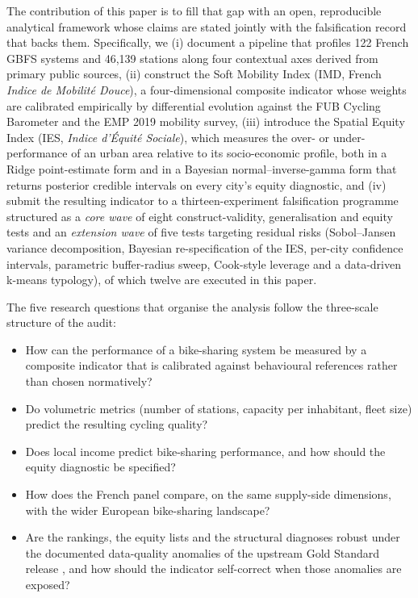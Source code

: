 \documentclass[11pt,a4paper]{article}
\begin{document}
The contribution of this paper is to fill that gap with an open,
reproducible analytical framework whose claims are stated jointly
with the falsification record that backs them. Specifically, we
(i) document a pipeline that profiles 122 French GBFS systems and
46{,}139 stations along four contextual axes derived from primary
public sources, (ii) construct the Soft Mobility Index (IMD,
French \emph{Indice de Mobilit\'e Douce}), a four-dimensional
composite indicator whose weights are calibrated empirically by
differential evolution against the FUB Cycling Barometer and the
EMP 2019 mobility survey, (iii) introduce the Spatial Equity Index
(IES, \emph{Indice d'\'Equit\'e Sociale}), which measures the
over- or under-performance of an urban area relative to its
socio-economic profile, both in a Ridge point-estimate form and in
a Bayesian normal--inverse-gamma form that returns posterior
credible intervals on every city's equity diagnostic, and (iv)
submit the resulting indicator to a thirteen-experiment
falsification programme structured as a \emph{core wave} of eight
construct-validity, generalisation and equity tests and an
\emph{extension wave} of five tests targeting residual risks
(Sobol--Jansen variance decomposition, Bayesian re-specification
of the IES, per-city confidence intervals, parametric
buffer-radius sweep, Cook-style leverage and a data-driven
k-means typology), of which twelve are executed in this paper.

The five research questions that organise the analysis follow
the three-scale structure of the audit:
\begin{itemize}
    \item[Q1.] How can the performance of a bike-sharing system be
    measured by a composite indicator that is calibrated against
    behavioural references rather than chosen normatively?
    \item[Q2.] Do volumetric metrics (number of stations, capacity
    per inhabitant, fleet size) predict the resulting cycling
    quality?
    \item[Q3.] Does local income predict bike-sharing performance,
    and how should the equity diagnostic be specified?
    \item[Q4.] How does the French panel compare, on the same
    supply-side dimensions, with the wider European
    bike-sharing landscape?
    \item[Q5.] Are the rankings, the equity lists and the
    structural diagnoses robust under the documented data-quality
    anomalies of the upstream Gold Standard release
    \citep{Fosse2026gold}, and how should the indicator
    self-correct when those anomalies are exposed?
\end{itemize}
\end{document}
